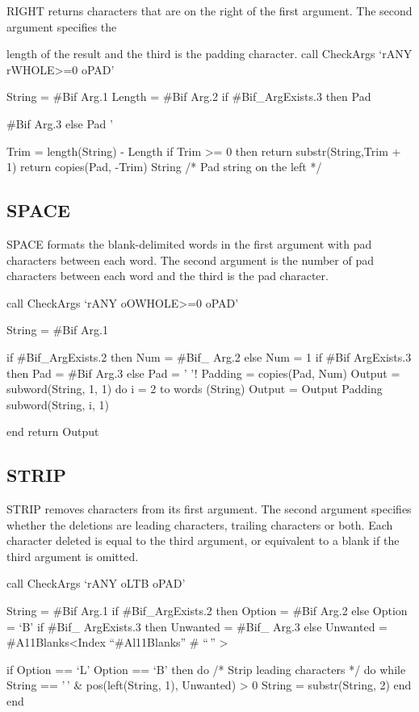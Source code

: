 RIGHT returns characters that are on the right of the first argument.
The second argument specifies the

length of the result and the third is the padding character. call
CheckArgs `rANY rWHOLE\textgreater=0 oPAD'

String = \#Bif Arg.1 Length = \#Bif Arg.2 if \#Bif\_ArgExists.3 then Pad

\#Bif Arg.3 else Pad '

Trim = length(String) - Length if Trim \textgreater= 0 then return
substr(String,Trim + 1) return copies(Pad, -Trim) \textbar\textbar{}
String /* Pad string on the left */

\subsection{SPACE}\label{space}

SPACE formats the blank-delimited words in the first argument with pad
characters between each word. The second argument is the number of pad
characters between each word and the third is the pad character.

call CheckArgs `rANY oOWHOLE\textgreater=0 oPAD'

String = \#Bif Arg.1

if \#Bif\_ArgExists.2 then Num = \#Bif\_ Arg.2 else Num = 1 if \#Bif
ArgExists.3 then Pad = \#Bif Arg.3 else Pad = ' '! Padding = copies(Pad,
Num) Output = subword(String, 1, 1) do i = 2 to words (String) Output =
Output \textbar\textbar{} Padding \textbar\textbar{} subword(String, i,
1)

end return Output

\subsection{STRIP}\label{strip}

STRIP removes characters from its first argument. The second argument
specifies whether the deletions are leading characters, trailing
characters or both. Each character deleted is equal to the third
argument, or equivalent to a blank if the third argument is omitted.

call CheckArgs `rANY oLTB oPAD'

String = \#Bif Arg.1 if \#Bif\_ArgExists.2 then Option = \#Bif Arg.2
else Option = `B' if \#Bif\_ ArgExists.3 then Unwanted = \#Bif\_ Arg.3
else Unwanted = \#A11Blanks\textless Index ``\#Al11Blanks'' \# ``\,''
\textgreater{}

if Option == `L' \textbar{} Option == `B' then do /* Strip leading
characters */ do while String == '\,' \& pos(left(String, 1), Unwanted)
\textgreater{} 0 String = substr(String, 2) end end

